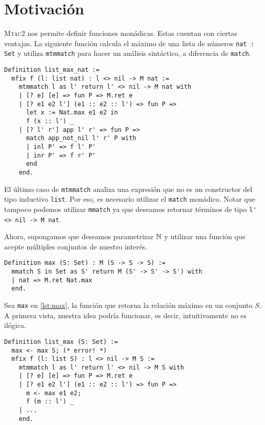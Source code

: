 \chapter{Motivación}\label{ch:motivacion}

\textsc{Mtac2} nos permite definir funciones monádicas. Estas cuentan con ciertas ventajas.
La siguiente función calcula el máximo de una lista de números \lstinline{nat : Set} y utiliza \lstinline{mtmmatch} para hacer un análisis sintáctico, a diferencia de \lstinline{match}.

\begin{lstlisting}[frame=tb,caption={Función \lstinline{list_max_nat}},label=lst:list_max_nat]
Definition list_max_nat :=
  mfix f (l: list nat) : l <> nil -> M nat :=
    mtmmatch l as l' return l' <> nil -> M nat with
    | [? e] [e] => fun P => M.ret e
    | [? e1 e2 l'] (e1 :: e2 :: l') => fun P =>
      let x := Nat.max e1 e2 in
      f (x :: l') _
    | [? l' r'] app l' r' => fun P =>
      match app_not_nil l' r' P with
      | inl P' => f l' P'
      | inr P' => f r' P'
      end
    end.
\end{lstlisting}

El último caso de \lstinline{mtmmatch} analiza una expresión que no es un constructor del tipo inductivo \lstinline{list}. Por eso, es necesario utilizar el \lstinline{match} monádico.
Notar que tampoco podemos utilizar \lstinline{mmatch} ya que deseamos retornar términos de tipo \lstinline{l' <> nil -> M nat}.

Ahora, supongamos que deseamos parametrizar $\mathbb{N}$ y utilizar una función que acepte múltiples conjuntos de nuestro interés.

\begin{lstlisting}[frame=tb,caption={Función \lstinline{max}},label=lst:max]
Definition max (S: Set) : M (S -> S -> S) :=
  mmatch S in Set as S' return M (S' -> S' -> S') with
  | nat => M.ret Nat.max
  end.
\end{lstlisting}

Sea \lstinline{max} en \ref{lst:max}, la función que retorna la relación máximo en un conjunto $S$.
A primera vista, nuestra idea podría funcionar, es decir, intuitivamente no es ilógica.

\begin{lstlisting}[frame=tb,caption={Función \lstinline{list_max}},label=lst:list_max]
Definition list_max (S: Set) :=
  max <- max S; (* error! *)
  mfix f (l: list S) : l <> nil -> M S :=
    mtmmatch l as l' return l' <> nil -> M S with
    | [? e] [e] => fun P => M.ret e
    | [? e1 e2 l'] (e1 :: e2 :: l') => fun P =>
      m <- max e1 e2;
      f (m :: l') _
    | ...
    end.
\end{lstlisting}

